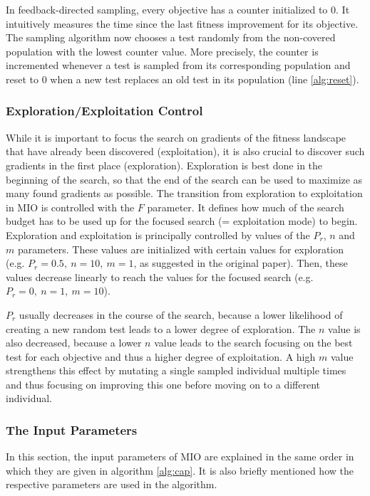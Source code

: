 \documentclass[
  a4paper,  %
  twoside,  %
  bibliography=totoc,
  headsepline,
  cleardoublepage=empty,
  parskip=half,
  draft=false
]{scrbook}
\begin{document}
In feedback-directed sampling, every objective has a counter initialized to $0$.
It intuitively measures the time since the last fitness improvement for its objective. 
The sampling algorithm now chooses a test randomly from the non-covered population with the lowest counter value.
More precisely, the counter is incremented whenever a test is sampled from its corresponding population and reset to 0 when a new test replaces an old test in its population (line \ref{alg:reset}).

\subsubsection{Exploration/Exploitation Control}
While it is important to focus the search on gradients of the fitness landscape that have already been discovered (exploitation), it is also crucial to discover such gradients in the first place (exploration).
Exploration is best done in the beginning of the search, so that the end of the search can be used to maximize as many found gradients as possible.
The transition from exploration to exploitation in MIO is controlled with the $F$ parameter. It defines how much of the search budget has to be used up for the focused search (= exploitation mode) to begin.
Exploration and exploitation is principally controlled by values of the $P_r$, $n$ and $m$ parameters. These values are initialized with certain values for exploration (e.g. $P_r = 0.5,\ n = 10,\ m = 1$, as suggested in the original paper).
Then, these values decrease linearly to reach the values for the focused search (e.g. $P_r = 0,\ n = 1,\ m = 10$).

$P_r$ usually decreases in the course of the search, because a lower likelihood of creating a new random test leads to a lower degree of exploration. The $n$ value is also decreased, because a lower $n$ value leads to the search focusing on the best test for each objective and thus a higher degree of exploitation. A high $m$ value strengthens this effect by mutating a single sampled individual multiple times and thus focusing on improving this one before moving on to a different individual.

\subsubsection{The Input Parameters}

In this section, the input parameters of MIO are explained in the same order in which they are given in algorithm \ref{alg:cap}. It is also briefly mentioned how the respective parameters are used in the algorithm.
\end{document}
